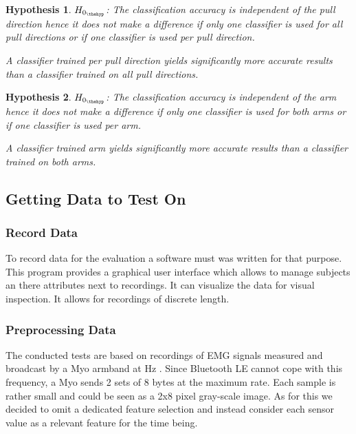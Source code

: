\documentclass[journal]{IEEEtran}
\newtheorem{hyp}{Hypothesis}
\begin{document}
\begin{hyp}\label{hyp:direction}
$H_{0_{\thehyp}}$: The classification accuracy is independent of the pull direction hence it does not make a difference if only one classifier is used for all pull directions or if one classifier is used per pull direction.

A classifier trained per pull direction yields significantly more accurate results than a classifier trained on all pull directions.
\end{hyp}

\begin{hyp}\label{hyp:arm}
$H_{0_{\thehyp}}$: The classification accuracy is independent of the arm hence it does not make a difference if only one classifier is used for both arms or if one classifier is used per arm.

A classifier trained arm yields significantly more accurate results than a classifier trained on both arms.
\end{hyp}

\subsection{Getting Data to Test On}

\subsubsection{Record Data}

To record data for the evaluation a software must was written for that purpose. This program provides a graphical user interface which allows to manage subjects an there attributes next to recordings. It can visualize the data for visual inspection. It allows for recordings of discrete length.

\subsubsection{Preprocessing Data}

The conducted tests are based on recordings of EMG signals measured and broadcast by a Myo armband at \unit[200]{Hz} \autocite{myo-emg}. Since Bluetooth LE cannot cope with this frequency, a Myo sends 2 sets of 8 bytes at the maximum rate. Each sample is rather small and could be seen as a 2x8 pixel gray-scale image. As for this we decided to omit a dedicated feature selection and instead consider each sensor value as a relevant feature for the time being.
\end{document}

